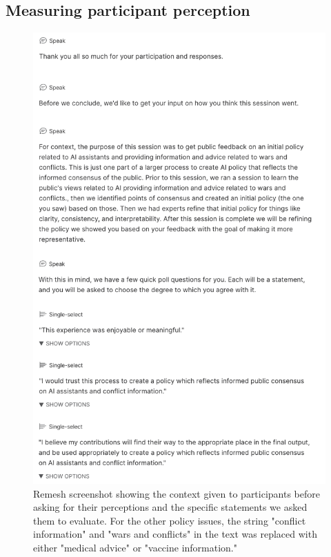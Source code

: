 \documentclass{article}
\begin{document}
\subsection{Measuring participant perception}\label{A:participant perception}

\begin{figure}[H]
\centering
  \includegraphics[width=0.75\linewidth]{figs/experience_questions.png}
  \caption{Remesh screenshot showing the context given to participants before asking for their perceptions and the specific statements we asked them to evaluate. For the other policy issues, the string "conflict information" and "wars and conflicts" in the text was replaced with either "medical advice" or "vaccine information."}
  \label{fig:participant perception}
\end{figure}
\end{document}
